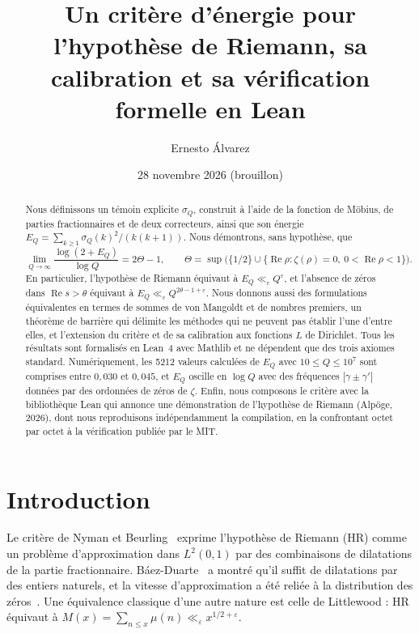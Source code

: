 \documentclass[11pt,a4paper]{amsart}
\title[Un crit\`ere d'\'energie pour l'hypoth\`ese de Riemann]{Un crit\`ere d'\'energie pour l'hypoth\`ese de Riemann, sa calibration et sa v\'erification formelle en Lean}
\author{Ernesto \'Alvarez}
\date{28 novembre 2026 (brouillon)}
\theoremstyle{definition}
\theoremstyle{remark}
\renewcommand{\Re}{\operatorname{Re}}
\begin{document}
\begin{abstract}
Nous d\'efinissons un t\'emoin explicite $\sigma_Q$, construit \`a l'aide de la fonction de M\"obius, de parties fractionnaires et de deux correcteurs, ainsi que son \'energie $E_Q=\sum_{k\ge1}\sigma_Q(k)^2/(k(k+1))$. Nous d\'emontrons, sans hypoth\`ese, que
\[
  \lim_{Q\to\infty}\frac{\log(2+E_Q)}{\log Q}=2\Theta-1,
  \qquad \Theta=\sup\bigl(\{1/2\}\cup\{\Re\rho:\zeta(\rho)=0,\ 0<\Re\rho<1\}\bigr).
\]
En particulier, l'hypoth\`ese de Riemann \'equivaut \`a $E_Q\ll_\varepsilon Q^\varepsilon$, et l'absence de z\'eros dans $\Re s>\theta$ \'equivaut \`a $E_Q\ll_\varepsilon Q^{2\theta-1+\varepsilon}$. Nous donnons aussi des formulations \'equivalentes en termes de sommes de von Mangoldt et de nombres premiers, un th\'eor\`eme de barri\`ere qui d\'elimite les m\'ethodes qui ne peuvent pas \'etablir l'une d'entre elles, et l'extension du crit\`ere et de sa calibration aux fonctions $L$ de Dirichlet. Tous les r\'esultats sont formalis\'es en Lean~4 avec Mathlib et ne d\'ependent que des trois axiomes standard. Num\'eriquement, les 5212 valeurs calcul\'ees de $E_Q$ avec $10\le Q\le10^7$ sont comprises entre $0{,}030$ et $0{,}045$, et $E_Q$ oscille en $\log Q$ avec des fr\'equences $|\gamma\pm\gamma'|$ donn\'ees par des ordonn\'ees de z\'eros de $\zeta$. Enfin, nous composons le crit\`ere avec la biblioth\`eque Lean qui annonce une d\'emonstration de l'hypoth\`ese de Riemann (Alp\"oge, 2026), dont nous reproduisons ind\'ependamment la compilation, en la confrontant octet par octet \`a la v\'erification publi\'ee par le MIT.
\end{abstract}

\maketitle

\section{Introduction}

Le crit\`ere de Nyman et Beurling~\cite{Nyman,Beurling} exprime l'hypoth\`ese de Riemann (HR) comme un probl\`eme d'approximation dans $L^2(0,1)$ par des combinaisons de dilatations de la partie fractionnaire. B\'aez-Duarte~\cite{BaezDuarte} a montr\'e qu'il suffit de dilatations par des entiers naturels, et la vitesse d'approximation a \'et\'e reli\'ee \`a la distribution des z\'eros~\cite{BalazardSaias,Burnol,BCF}. Une \'equivalence classique d'une autre nature est celle de Littlewood : HR \'equivaut \`a $M(x)=\sum_{n\le x}\mu(n)\ll_\varepsilon x^{1/2+\varepsilon}$.
\end{document}
